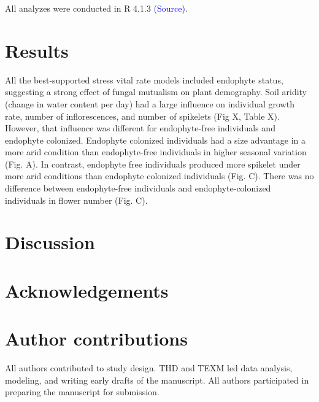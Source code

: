 \documentclass[11pt]{article}
\begin{document}
All  analyzes were conducted in R 4.1.3 \textcolor{blue}{(Source)}. 


\section*{Results}
All the best-supported stress vital rate models  included endophyte status, suggesting a strong 
effect of fungal mutualism on plant demography. Soil aridity (change in water content per day) had a large influence on individual growth rate, number of inflorescences, and number of spikelets (Fig X, Table X). However, that influence was different for endophyte-free individuals and endophyte colonized. Endophyte colonized individuals had a size advantage in a more arid condition than endophyte-free individuals in higher seasonal variation (Fig. A). In contrast, endophyte free individuals produced more spikelet under more arid conditions than endophyte colonized individuals (Fig. C). There was no difference between endophyte-free individuals and endophyte-colonized individuals in flower number (Fig. C). 

\section*{Discussion}





\section*{Acknowledgements}

\section*{Author contributions}
All authors contributed to study design. 
THD and TEXM led data analysis, modeling, and writing early drafts of the manuscript. 
All authors participated in preparing the manuscript for submission.




\newpage
\end{document}
